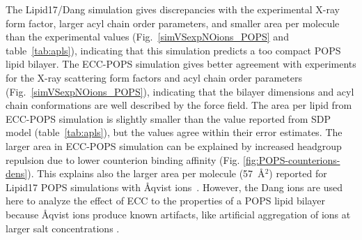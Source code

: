 \documentclass[journal=jpcbfk,manuscript=article]{achemso}
\begin{document}
The Lipid17/Dang simulation gives 
discrepancies with the experimental X-ray form factor,
larger acyl chain order parameters,
and smaller area per molecule than the experimental values (Fig.~\ref{simVSexpNOions_POPS} and table~\ref{tab:apls}),
indicating that this simulation predicts a too compact POPS lipid bilayer. 
The ECC-POPS simulation gives better agreement with experiments for the X-ray scattering form factors and 
acyl chain order parameters (Fig.~\ref{simVSexpNOions_POPS}),
indicating that the bilayer dimensions and acyl chain
conformations are well described by the force field. The area per lipid from ECC-POPS simulation is slightly
smaller than the value reported from SDP model \cite{kucerka14} (table~\ref{tab:apls}), but the values
agree within their error estimates. The larger area in ECC-POPS simulation can be
explained by increased headgroup repulsion due to lower counterion binding affinity (Fig. \ref{fig:POPS-counterions-dens}).
This explains also the larger area per molecule (57~\AA$^2$) reported for Lipid17 POPS simulations
with {\AA}qvist ions~\cite{NMRlipidsIV}.
However, the Dang ions are used here to analyze the effect of ECC to the properties of a POPS lipid bilayer because
{\AA}qvist ions produce known artifacts, like artificial aggregation of ions at larger salt concentrations \cite{kohagen16, chen07, NMRlipidsIV}.
\end{document}
